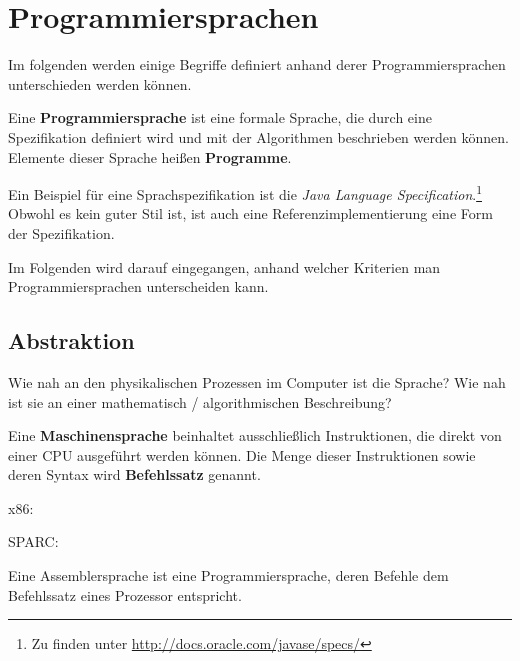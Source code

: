 \chapter{Programmiersprachen}
Im folgenden werden einige Begriffe definiert anhand derer
Programmiersprachen unterschieden werden können.

\begin{definition}%
    Eine \textbf{Programmiersprache} ist eine formale Sprache, die durch eine
    Spezifikation definiert wird und mit der Algorithmen beschrieben werden
    können. Elemente dieser Sprache heißen \textbf{Programme}.
\end{definition}

Ein Beispiel für eine Sprachspezifikation ist die \textit{Java Language Specification}.\footnote{Zu finden unter \url{http://docs.oracle.com/javase/specs/}} Obwohl es kein guter Stil ist, ist auch
eine Referenzimplementierung eine Form der Spezifikation.

Im Folgenden wird darauf eingegangen, anhand welcher Kriterien man 
Programmiersprachen unterscheiden kann.

\section{Abstraktion}
Wie nah an den physikalischen Prozessen im Computer ist die Sprache?
Wie nah ist sie an einer mathematisch / algorithmischen Beschreibung?

\begin{definition}%
    Eine \textbf{Maschinensprache} beinhaltet ausschließlich Instruktionen, die direkt
    von einer CPU ausgeführt werden können. Die Menge dieser Instruktionen 
    sowie deren Syntax wird \textbf{Befehlssatz} genannt.
\end{definition}

\begin{beispiel}[Maschinensprachen]
    \begin{bspenum}
        \item {}x86: 
        \item {}SPARC:
    \end{bspenum}
\end{beispiel}

\begin{definition}[Assembler]%
    Eine Assemblersprache ist eine Programmiersprache, deren Befehle dem
    Befehlssatz eines Prozessor entspricht.
\end{definition}

